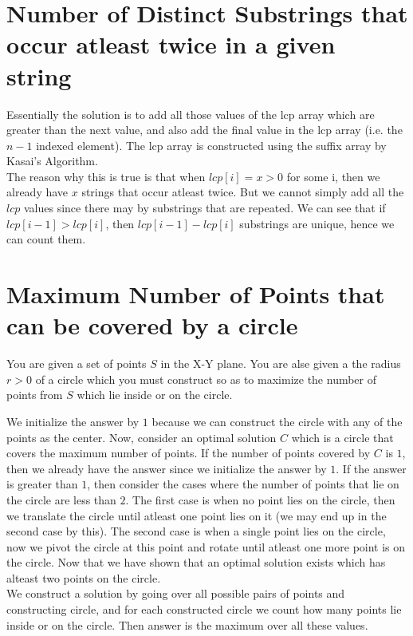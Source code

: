 \documentclass{article}
\begin{document}
    \section{
        Number of Distinct Substrings that occur atleast twice in a
        given string
    }

    Essentially the solution is to add all those values of the lcp array
    which are greater than the next value, and also add the final value in
    the lcp array (i.e. the $n - 1$ indexed element). The lcp array is
    constructed using the suffix array by Kasai's Algorithm. \\
    The reason why this is true is that when $lcp[i] = x > 0$ for some i, then
    we already have $x$ strings that occur atleast twice. But we cannot simply
    add all the $lcp$ values since there may by substrings that are repeated.
    We can see that if $lcp[i - 1] > lcp[i]$, then $lcp[i - 1] - lcp[i]$
    substrings are unique, hence we can count them.

    \section{Maximum Number of Points that can be covered by a circle}

    You are given a set of points $S$ in the X-Y plane. You are alse given
    a the radius $r > 0$ of a circle which you must construct so as to maximize
    the number of points from $S$ which lie inside or on the circle.

    We initialize the answer by $1$ because we can construct the circle with
    any of the points as the center. Now, consider an optimal solution $C$
    which is a circle that covers the maximum number of points. If the number
    of points covered by $C$ is $1$, then we already have the answer since we
    initialize the answer by $1$. If the answer is greater than $1$, then
    consider the cases where the number of points that lie on the circle are
    less than $2$. The first case is when no point lies on the circle,
    then we translate the circle until atleast one point lies on it (we may
    end up in the second case by this). The second case is when a single point
    lies on the circle, now we pivot the circle at this point and rotate until
    atleast one more point is on the circle. Now that we have shown that an
    optimal solution exists which has alteast two points on the circle. \\
    We construct a solution by going over all possible pairs of points and
    constructing circle, and for each constructed circle we count how many
    points lie inside or on the circle. Then answer is the maximum over all
    these values.
\end{document}
